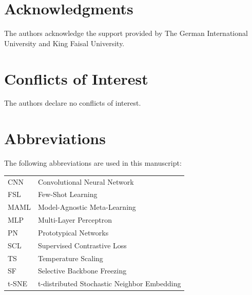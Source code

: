\documentclass[preprint,12pt,authoryear]{elsarticle}
\begin{document}
\section*{Acknowledgments}
The authors acknowledge the support provided by The German International University
and King Faisal University.

\section*{Conflicts of Interest}
The authors declare no conflicts of interest.

\section*{Abbreviations}
The following abbreviations are used in this manuscript:

\begin{tabular}{ll}
CNN  & Convolutional Neural Network \\
FSL  & Few-Shot Learning \\
MAML & Model-Agnostic Meta-Learning \\
MLP  & Multi-Layer Perceptron \\
PN   & Prototypical Networks \\
SCL  & Supervised Contrastive Loss \\
TS   & Temperature Scaling \\
SF   & Selective Backbone Freezing \\
t-SNE & t-distributed Stochastic Neighbor Embedding \\
\end{tabular}

\end{document}
